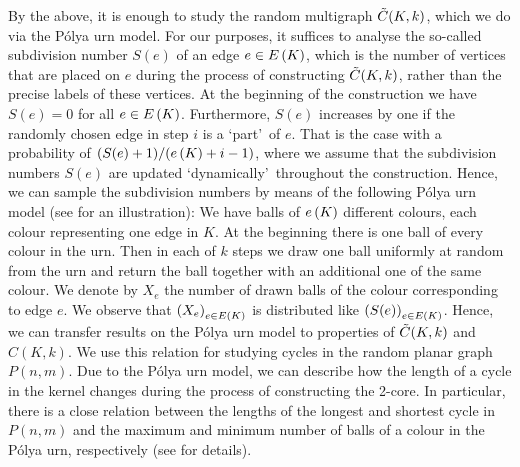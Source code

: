 By the above, it is enough to study the random multigraph $\Tilde{C}(K,k)$, which we do via the P\'olya urn model. For our purposes, it suffices to analyse the so-called subdivision number $S(e)$ of an edge $e\in E\left(K\right)$, which is the number of vertices that are placed on $e$ during the process of constructing $\Tilde{C}(K,k)$, rather than the precise labels of these vertices. At the beginning of the construction we have $S(e)=0$ for all $e\in E\left(K\right)$. Furthermore, $S(e)$ increases by one if the randomly chosen edge in step $i$ is a \lq part\rq\ of $e$. That is the case with a probability of $(S(e)+1)/(e\left({K}\right)+i-1)$, where we assume that the subdivision numbers $S(e)$ are updated \lq dynamically\rq\ throughout the construction. Hence, we can sample the subdivision numbers by means of the following P\'olya urn model (see  for an illustration): We have balls of $e\left({K}\right)$ different colours, each colour representing one edge in $K$. At the beginning there is one ball of every colour in the urn. Then in each of $k$ steps we draw one ball uniformly at random from the urn and return the ball together with an additional one of the same colour. We denote by $X_e$ the number of drawn balls of the colour corresponding to edge $e$. We observe that $\left(X_e\right)_{e\in E\left(K\right)}$ is distributed like $\left(S(e)\right)_{e\in E\left(K\right)}$. Hence, we can transfer results on the P\'olya urn model to properties of $\Tilde{C}(K,k)$ and $C(K,k)$. We use this relation for studying cycles in the random planar graph $P(n,m)$. Due to the P\'olya urn model, we can describe how the length of a cycle in the kernel changes during the process of constructing the 2-core. In particular, there is a close relation between the lengths of the longest and shortest cycle in $P(n,m)$ and the maximum and minimum number of balls of a colour in the P\'olya urn, respectively (see  for details).

